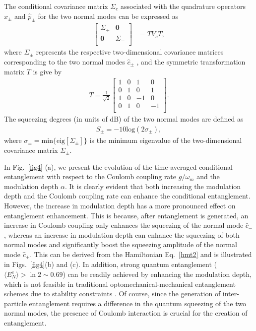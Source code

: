 \documentclass[
aps,
reprint,
superscriptaddress,
amsmath,amssymb,
pra
]{revtex4-2}
\begin{document}
The conditional covariance matrix $\Sigma_c$ associated with the quadrature operators $\hat x_{\pm}$ and $\hat p_{\pm}$ for the two normal modes can be expressed as 
\begin{align}
\left[ \begin{matrix}
   {{\Sigma }_{+}} & \bm 0  \\
   \bm 0 & {{\Sigma }_{-}}  \\
\end{matrix} \right] & = T{{V}_{c}}T,
\end{align}
where ${\Sigma }_{\pm }$ represents the respective two-dimensional covariance matrices corresponding to the two normal modes $\hat c_{\pm}$ , and the symmetric transformation matrix $T$ is give by 
\begin{align}
T=\frac{1}{\sqrt{2}}\left[ \begin{matrix}
   1 & 0 & 1 & 0  \\
   0 & 1 & 0 & 1  \\
   1 & 0 & -1 & 0  \\
   0 & 1 & 0 & -1  \\
\end{matrix} \right].
\end{align}
The squeezing degrees (in units of $\text{dB}$) of the two normal modes are defined as 
\begin{align}
S_{\pm} = -10 \mathrm{log}(2\sigma_{\pm}),
\end{align}
where $\sigma_{\pm}=\mathrm{min}\{\mathrm{eig}[\Sigma_{\pm}]\}$ is the minimum eigenvalue of the two-dimensional covariance matrix $\Sigma_{\pm}$. 

In Fig.~\ref{fig4} (a), we present the evolution of the time-averaged conditional entanglement with respect to the Coulomb coupling rate $g/\omega_m$ and the modulation depth $\alpha$. It is clearly evident that both increasing the modulation depth and the Coulomb coupling rate can enhance the conditional entanglement. However, the increase in modulation depth has a more pronounced effect on entanglement enhancement. This is because, after entanglement is generated, an increase in Coulomb coupling only enhances the squeezing of the normal mode $\hat c_-$, whereas an increase in modulation depth can enhance the squeezing of both normal modes and significantly boost the squeezing amplitude of the normal mode $\hat c_+$. This can be derived from the Hamiltonian Eq.~\ref{hmt2} and is illustrated in Figs.~\ref{fig4}(b) and (c). In addition, strong quantum entanglement ($\langle E_N^c \rangle > \ln 2 \sim 0.69$) can be readily achieved by enhancing the modulation depth, which is not feasible in traditional optomechanical-mechanical entanglement schemes due to stability constraints \cite{PhysRevA.95.053842}. Of course, since the generation of inter-particle entanglement requires a difference in the quantum squeezing of the two normal modes, the presence of Coulomb interaction is crucial for the creation of entanglement.
\end{document}
